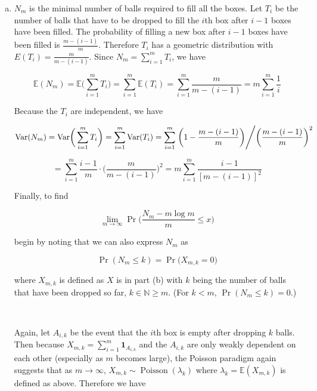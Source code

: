 \documentclass{article}
\newcommand{\E}{\mathbb{E}}
\newcommand{\Var}{\mathrm{Var}}
\begin{document}
\begin{enumerate}[(a)]
\item



\(N_m\) is the minimal number of balls required to fill all the boxes. Let \(T_i\) be the number of balls that have to be dropped to fill the \(i\)th box after \(i - 1\) boxes have been filled. The probability of filling a new box after \(i -1\) boxes have been filled is \( \frac{m - (i - 1)}{m}\). Therefore \(T_i\) has a geometric distribution with \(E(T_i) = \frac{m}{m - (i - 1)}\). Since \(N_m = \sum_{i=1}^m T_i\), we have


\[
\E(N_m) = \E \bigg(  \sum_{i=1}^m T_i   \bigg) =  \sum_{i=1}^m \E( T_i )  =  \sum_{i=1}^m \frac{m}{m - (i - 1)} = \boxed{m  \sum_{i=1}^m \frac{1}{i }}
\]

Because the \(T_i\) are independent, we have

\[
\Var(N_m) = \Var \bigg(  \sum_{i=1}^m T_i   \bigg) =  \sum_{i=1}^m \Var( T_i )  =  \sum_{i=1}^m \left. \bigg( 1 -  \frac{m - (i - 1)}{m} \bigg) \middle/ \bigg( \frac{m - (i - 1)}{m} \bigg)^2 \right.
\]

\[
=  \sum_{i=1}^m  \frac{  i - 1}{m} \cdot \bigg( \frac{m}{m - (i - 1)} \bigg)^2 = \boxed{  m\sum_{i=1}^m  \frac{ i - 1}{[m - (i - 1)]^2} }
\]


Finally, to find

\[
\lim_{m \to \infty} \Pr \bigg( \frac{N_m - m \log m}{m} \leq x \bigg) 
\]

begin by noting that we can also express \(N_m\) as 

\[
\Pr(N_m \leq k) = \Pr \big( X_{m, k} = 0 \big)
\]

where \(X_{m, k}\) is defined as \(X\) is in part (b) with \(k\) being the number of balls that have been dropped so far, \(k \in \mathbb{N} \geq m\). (For \(k < m\), \(\Pr(N_m \leq k) = 0\).)

\

Again, let \(A_{i,k}\) be the event that the \(i\)th box is empty after dropping \(k\) balls. Then because \(X_{m, k} = \sum_{i=1}^m \boldsymbol{1}_{A_{i,k}}\) and the \(A_{i,k}\) are only weakly dependent on each other (especially as \(m\) becomes large), the Poisson paradigm again suggests that as \(m \to \infty\), \(X_{m, k} \sim \operatorname{Poisson}(\lambda_k)\) where \(\lambda_k = \E(X_{m,k})\) is defined as above. Therefore we have


\end{enumerate}
\end{document}
